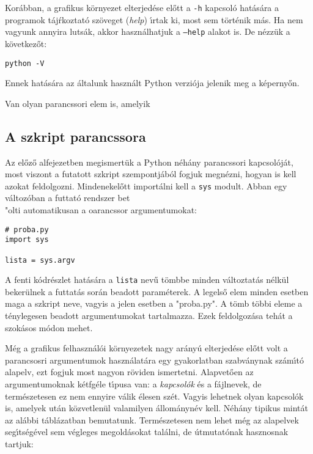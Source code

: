 \noindent Kor\'abban, a grafikus k\"ornyezet elterjed\'ese el\H{o}tt a {\tt -h} kapcsol\'o 
hat\'as\'ara a programok t\'aj\'rkoztat\'o sz\"oveget ({\it help}) \'{\i}rtak ki, most sem 
t\"ort\'enik m\'as. Ha nem vagyunk annyira luts\'ak, akkor haszn\'alhatjuk a {\tt --help} 
alakot is. De n\'ezz\"uk a k\"ovetkez\H{o}t:

\begin{Verbatim}[fontsize=\small]
python -V
\end{Verbatim}

\noindent Ennek hat\'as\'ara az \'altalunk haszn\'alt Python verzi\'oja jelenik meg a k\'eperny\H{o}n.

Van olyan parancssori elem is, amelyik 

\subsection{A szkript parancssora}

Az el\H{o}z\H{o} alfejezetben megismert\"uk a Python n\'eh\'any parancssori kapcsol\'oj\'at, most viszont 
a futatott szkript szempontj\'ab\'ol fogjuk megn\'ezni, hogyan is kell azokat feldolgozni. Mindenekel\H{o}tt 
import\'alni kell a {\tt sys} modult. Abban egy v\'altoz\'oban a futtat\'o rendszer bet\\"olti automatikusan 
a oarancssor argumentumokat:

\begin{Verbatim}[fontsize=\small]
# proba.py 
import sys

lista = sys.argv
\end{Verbatim}

\noindent A fenti k\'odr\'eszlet hat\'as\'ara a {\tt lista} nev\H{u} t\"ombbe minden v\'altoztat\'as n\'elk\"ul 
beker\"ulnek a futtat\'as sor\'an beadott param\'eterek. A legels\H{o} elem minden esetben maga a szkript neve, 
vagyis a jelen esetben a "proba.py". A t\"omb t\"obbi eleme a t\'enylegesen beadott  argumentumokat tartalmazza. 
Ezek feldolgoz\'asa teh\'at a szok\'asos m\'odon mehet. 

M\'eg a grafikus felhaszn\'al\'oi k\"ornyezetek nagy ar\'any\'u elterjed\'ese el\H{o}tt volt a parancsosri 
argumentumok haszn\'alat\'ara egy gyakorlatban szabv\'anynak sz\'a\-m\'{\i}\-t\'o alapelv, ezt fogjuk most 
nagyon r\"oviden ismertetni. Alapvet\H{o}en az argumentumoknak k\'etfg\'ele t\'{\i}pusa van: a {\sl kapcsol\'ok} 
\'es a f\'ajlnevek, de term\'eszetesen ez nem ennyire v\'alik \'elesen sz\'et. Vagyis lehetnek olyan kapcsol\'ok 
is, amelyek ut\'an k\"ozvetlen\"ul valamilyen \'allom\'anyn\'ev kell. N\'eh\'any tipikus mint\'at az 
al\'abbi t\'abl\'azatban bemutatunk. Term\'eszetesen nem lehet m\'eg az alapelvek seg\'{\i}ts\'eg\'evel sem 
v\'egleges megold\'asokat tal\'alni, de \'utmutat\'onak hasznosnak tartjuk:

